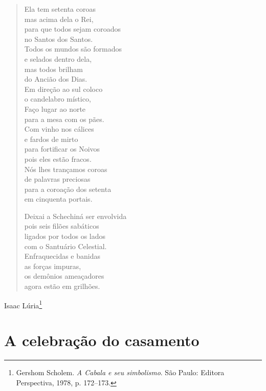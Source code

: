 \begin{verse}
Ela tem setenta coroas\\
mas acima dela o Rei,\\
para que todos sejam coroados\\
no Santos dos Santos.\\[5pt]

Todos os mundos são formados\\
e selados dentro dela,\\
mas todos brilham\\
do Ancião dos Dias.\\[5pt]

Em direção ao sul coloco\\
o candelabro místico,\\
Faço lugar ao norte\\
para a mesa com os pães.\\[5pt]

Com vinho nos cálices\\
e fardos de mirto\\
para fortificar os Noivos\\
pois eles estão fracos.\\[5pt]

Nós lhes trançamos coroas\\
de palavras preciosas\\
para a coroação dos setenta\\
em cinquenta portais.\\[5pt]

\pagebreak

Deixai a Schechiná ser envolvida\\
pois seis filões sabáticos\\
ligados por todos os lados\\
com o Santuário Celestial.\\[5pt]

Enfraquecidas e banidas\\
as forças impuras,\\
os demônios ameaçadores\\
agora estão em grilhões.
\end{verse}

\begin{flushright}
Isaac Lúria\footnote{Gershom Scholem. \emph{A Cabala e seu simbolismo}. São Paulo: Editora Perspectiva, 1978, p. 172--173.}
\end{flushright}

\chapter*{A celebração do casamento}

